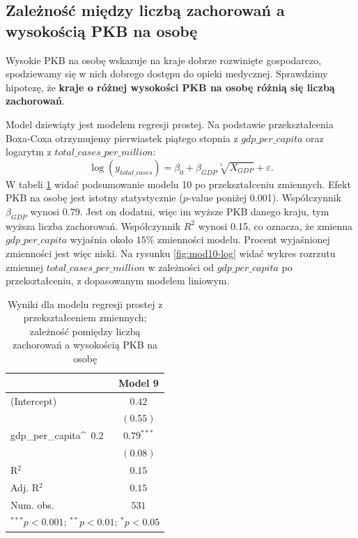 \documentclass[12pt]{mwbk}
\theoremstyle{plain}
\theoremstyle{definition}
\theoremstyle{definition}
\newcommand\zrodlo[1]{\par\vspace{-3mm}{\small\textit{Źródło: }#1 }}
\begin{document}
\subsection{Zależność między liczbą zachorowań a wysokością PKB na osobę}

Wysokie PKB na osobę wskazuje na kraje dobrze rozwinięte gospodarczo, spodziewamy się w nich dobrego dostępu do opieki medycznej. Sprawdzimy hipotezę, że \textbf{kraje o różnej wysokości PKB na osobę różnią się liczbą zachorowań}.


Model dziewiąty jest modelem regresji prostej. Na podstawie przekształcenia Boxa-Coxa otrzymujemy pierwiastek piątego stopnia z $gdp\_per\_capita$ oraz logarytm z $total\_cases\_per\_million$:
$$\log(y_{total\_cases})=\beta_0+\beta_{GDP}\sqrt[5]{X_{GDP}}+\varepsilon.$$
W tabeli \ref{table:mod10-log} widać podsumowanie modelu 10 po przekształceniu zmiennych.
Efekt PKB na osobę jest istotny statystycznie ($p$-value poniżej 0.001). Współczynnik $\beta_{GDP}$ wynosi 0.79. Jest on dodatni, więc im wyższe PKB danego kraju, tym wyższa liczba zachorowań. Współczynnik $R^2$ wynosi 0.15, co oznacza, że zmienna $gdp\_per\_capita$ wyjaśnia około $15\%$ zmienności modelu. Procent wyjaśnionej zmienności jest więc niski. Na rysunku \ref{fig:mod10-log} widać wykres rozrzutu zmiennej $total\_cases\_per\_million$ w zależności od $gdp\_per\_capita$ po przekształceniu, z dopasowanym modelem liniowym.

\begin{table}[!htbp]
	\begin{center}
			\caption{Wyniki dla modelu regresji prostej z przekształceniem zmiennych; zależność pomiędzy liczbą zachorowań a wysokością PKB na osobę}
			
		\begin{tabular}{l c}
			\hline
			& Model 9 \\
			\hline
			(Intercept)          & $0.42$       \\
			& $(0.55)$     \\
			gdp\_per\_capita\^~0.2 & $0.79^{***}$ \\
			& $(0.08)$     \\
			\hline
			R$^2$                & $0.15$       \\
			Adj. R$^2$           & $0.15$       \\
			Num. obs.            & $531$        \\
			\hline
			\multicolumn{2}{l}{\scriptsize{$^{***}p<0.001$; $^{**}p<0.01$; $^{*}p<0.05$}}
		\end{tabular}
	
		\label{table:mod10-log}
		\vskip 0.5cm
	\zrodlo{Opracowanie własne} 
	\end{center}
\end{table}
\end{document}
